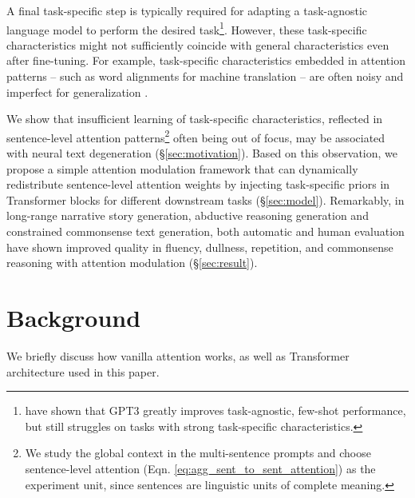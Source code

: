 \documentclass[11pt,a4paper]{article}
\newcommand{\alg}{attention modulation}
\begin{document}
A final task-specific step is typically required for adapting a task-agnostic language model to perform the desired task\footnote{\citet{Brown2020LanguageMA} have shown that GPT3 greatly improves task-agnostic, few-shot performance, but still struggles on tasks with strong task-specific characteristics.}. However, these task-specific characteristics might not sufficiently coincide with general characteristics even after fine-tuning. %
For example, task-specific characteristics embedded in attention patterns -- such as word alignments for machine translation -- are often noisy and imperfect for generalization \citep{kobayashi-etal-2020-attention}. %

We show that insufficient learning of task-specific characteristics, reflected in sentence-level 
attention patterns\footnote{We study the global context in the multi-sentence prompts and choose sentence-level attention (Eqn. \ref{eq:agg_sent_to_sent_attention}) as the experiment unit, since sentences are linguistic units of complete meaning.}  often being out of focus, may be associated with neural text degeneration (\S \ref{sec:motivation}). Based on this observation, we propose a simple attention modulation framework that can dynamically redistribute sentence-level attention weights by injecting task-specific priors in Transformer blocks for different downstream tasks (\S \ref{sec:model}). Remarkably, in long-range narrative story generation, abductive reasoning generation and constrained commonsense text generation, both automatic and human evaluation have shown improved quality in fluency, dullness, repetition, and commonsense reasoning with \alg{} (\S \ref{sec:result}). 




\section{Background}\label{sec:vinalla_attention}
We briefly discuss how vanilla attention works, as well as Transformer architecture used in this paper. 
\end{document}
